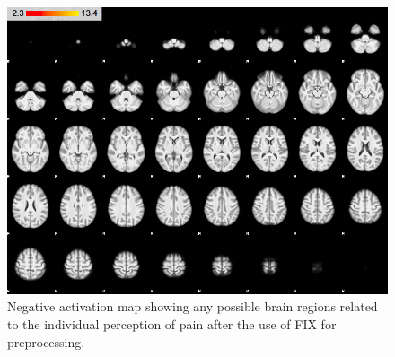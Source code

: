 \begin{figure}[H]                 
	\includegraphics[width=.65\textwidth]{figures/Results/FIX_neg_ID}  
	\caption{Negative activation map showing any possible brain regions related to the individual perception of pain after the use of FIX for preprocessing.}
	\label{FIX_neg_ID} 
\end{figure}


















